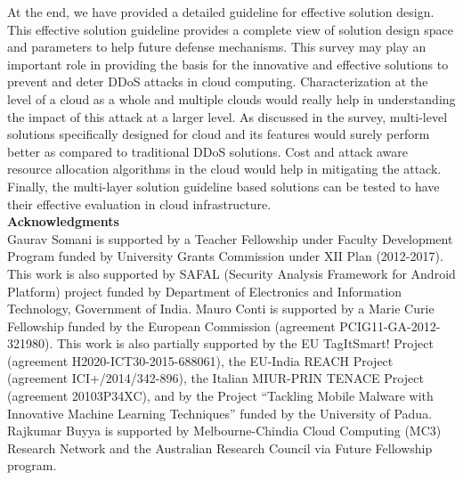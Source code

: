 \documentclass[final,5p,times,twocolumn]{elsarticle}
\begin{document}
{At the end, we have provided a detailed guideline for effective solution design. This effective solution guideline provides a complete view of solution design space and parameters to help future defense mechanisms. This survey may play an important role in providing the basis for the innovative and effective solutions to prevent and deter DDoS attacks in cloud computing. Characterization at the level of a cloud as a whole and multiple clouds would really help in understanding the impact of this attack at a larger level. As discussed in the survey, multi-level solutions specifically designed for cloud and its features would surely perform better as compared to traditional DDoS solutions. Cost and attack aware resource allocation algorithms in the cloud would help in mitigating the attack. Finally, the multi-layer solution guideline based solutions can be tested to have their effective evaluation in cloud infrastructure.}
\vspace{10mm}\\
{\bf \noindent Acknowledgments}\\
Gaurav Somani is supported by a Teacher Fellowship under Faculty Development Program funded by University Grants Commission under XII Plan (2012-2017). This work is also supported by SAFAL (Security Analysis Framework for Android Platform) project funded by Department of Electronics and Information Technology, Government of India. Mauro Conti is supported by a Marie Curie Fellowship funded by the European Commission (agreement PCIG11-GA-2012-321980). This work is also partially supported by the EU TagItSmart! Project (agreement H2020-ICT30-2015-688061), the EU-India REACH Project (agreement ICI+/2014/342-896), the Italian MIUR-PRIN TENACE Project (agreement 20103P34XC), and by the Project “Tackling Mobile Malware with Innovative Machine Learning Techniques” funded by the University of Padua. Rajkumar Buyya is supported by Melbourne-Chindia Cloud Computing (MC3) Research Network and the Australian Research Council via Future Fellowship program.
\vspace{-4mm}

 
\end{document}
